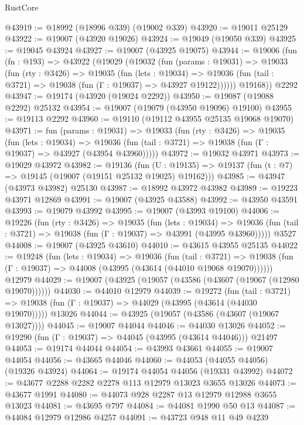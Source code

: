\begin{lexlean}{RustCore}
\begin{coremodule}
@43919 := @18992 (@18996 @339) (@19002 @339)
@43920 := @19011 @25129
@43922 := @19007 (@43920 @19026)
@43924 := @19049 (@19050 @339)
@43925 := @19045 @43924
@43927 := @19007 (@43925 @19075)
@43944 := @19006
    (fun (fn : @193) =>
    @43922
      (@19029
        (@19032
          (fun (params : @19031) =>
          @19033
            (fun (rty : @3426) =>
            @19035
              (fun (lets : @19034) =>
              @19036 (fun (tail : @3721) => @19038 (fun (Γ : @19037) => @43927 @19122))))))
        @19168))
    @2292
@43947 := @19174 (@43920 (@19024 @2292))
@43950 := @19087 (@19088 @2292) @25132
@43954 := @19007 (@19079 (@43950 @19096) @19100)
@43955 := @19113 @2292
@43960 := @19110 (@19112 @43955 @25135 @19068 @19070)
@43971 := fun (params : @19031) =>
  @19033
    (fun (rty : @3426) =>
    @19035
      (fun (lets : @19034) =>
      @19036 (fun (tail : @3721) => @19038 (fun (Γ : @19037) => @43927 (@43954 @43960)))))
@43972 := @19032 @43971
@43973 := @19029 @43972
@43982 := @19136
    (fun (U : @19135) => @19137 (fun (t : @7) => @19145 (@19007 (@19151 @25132 @19025) @19162)))
@43985 := @43947 (@43973 @43982) @25130
@43987 := @18992 @43972 @43982
@43989 := @19223 @43971 @12869
@43991 := @19007 (@43925 @43588)
@43992 := @43950 @43591
@43993 := @19079 @43992
@43995 := @19007 (@43993 @19100)
@44006 := @19226
    (fun (rty : @3426) =>
    @19035
      (fun (lets : @19034) =>
      @19036 (fun (tail : @3721) => @19038 (fun (Γ : @19037) => @43991 (@43995 @43960)))))
    @3527
@44008 := @19007 (@43925 @43610)
@44010 := @43615 @43955 @25135
@44022 := @19248
    (fun (lets : @19034) =>
    @19036
      (fun (tail : @3721) =>
      @19038 (fun (Γ : @19037) => @44008 (@43995 (@43614 (@44010 @19068 @19070))))))
    @12979
@44029 := @19007 (@43925 (@19057 (@43586 (@43607 (@19067 (@12980 @19070))))))
@44030 := @44010 @12979
@44039 := @19272
    (fun (tail : @3721) => @19038 (fun (Γ : @19037) => @44029 (@43995 (@43614 (@44030 @19070)))))
    @13026
@44044 := @43925 (@19057 (@43586 (@43607 (@19067 @13027))))
@44045 := @19007 @44044
@44046 := @44030 @13026
@44052 := @19290 (fun (Γ : @19037) => @44045 (@43995 (@43614 @44046))) @21497
@44053 := @19174 @44044
@44054 := @43993 @43661
@44055 := @19007 @44054
@44056 := @43665 @44046
@44060 := @44053 (@44055 @44056) (@19326 @43924)
@44064 := @19174 @44054 @44056 (@19331 @43992)
@44072 := @43677 @2288 @2282 @2278 @113 @12979 @13023 @3655 @13026
@44073 := @43677 @1991
@44080 := @44073 @928 @2287 @13 @12979 @12988 @3655 @13023
@44081 := @43695 @797
@44084 := @44081 @1990 @50 @13
@44087 := @44084 @12979 @12986 @4257
@44091 := @43723 @948 @11 @49 @4239

\end{coremodule}
\end{lexlean}
